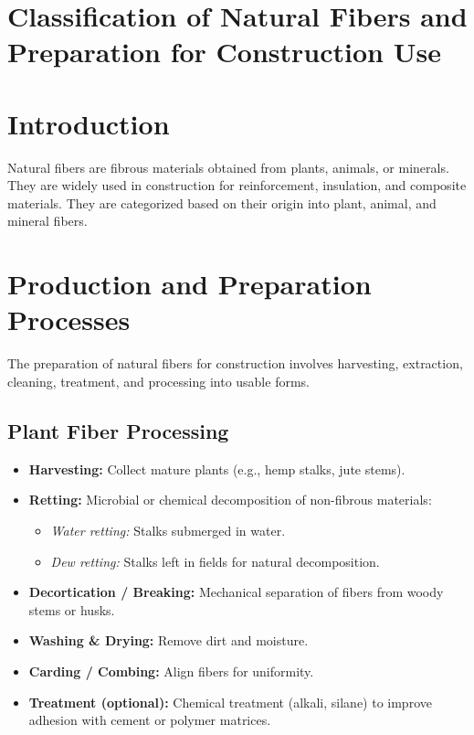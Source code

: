 \documentclass[12pt,a4paper]{article}
\begin{document}
\section*{Classification of Natural Fibers and Preparation for Construction Use}

\section{Introduction}

Natural fibers are fibrous materials obtained from plants, animals, or minerals. They are widely used in construction for reinforcement, insulation, and composite materials. They are categorized based on their origin into plant, animal, and mineral fibers.

\section{Production and Preparation Processes}

The preparation of natural fibers for construction involves harvesting, extraction, cleaning, treatment, and processing into usable forms.

\subsection{Plant Fiber Processing}
\begin{itemize}
    \item \textbf{Harvesting:} Collect mature plants (e.g., hemp stalks, jute stems).
    \item \textbf{Retting:} Microbial or chemical decomposition of non-fibrous materials:
    \begin{itemize}
        \item \textit{Water retting:} Stalks submerged in water.
        \item \textit{Dew retting:} Stalks left in fields for natural decomposition.
    \end{itemize}
    \item \textbf{Decortication / Breaking:} Mechanical separation of fibers from woody stems or husks.
    \item \textbf{Washing \& Drying:} Remove dirt and moisture.
    \item \textbf{Carding / Combing:} Align fibers for uniformity.
    \item \textbf{Treatment (optional):} Chemical treatment (alkali, silane) to improve adhesion with cement or polymer matrices.
\end{itemize}
\end{document}
